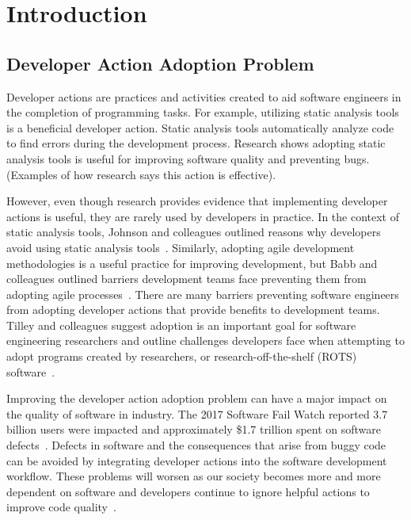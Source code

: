 \section{Introduction}

\subsection{Developer Action Adoption Problem}

Developer actions are practices and activities created to aid software engineers in the completion of programming tasks. For example, utilizing static analysis tools is a beneficial developer action. Static analysis tools automatically analyze code to find errors during the development process. Research shows adopting static analysis tools is useful for improving software quality and preventing bugs. (Examples of how research says this action is effective).

However, even though research provides evidence that implementing developer actions is useful, they are rarely used by developers in practice. In the context of static analysis tools, Johnson and colleagues outlined reasons why developers avoid using static analysis tools~\cite{Johnson2013Why}. Similarly, adopting agile development methodologies is a useful practice for improving development, but Babb and colleagues outlined barriers development teams face preventing them from adopting agile processes~\cite{BabbAgileBarriers}. There are many barriers preventing software engineers from adopting developer actions that provide benefits to development teams. Tilley and colleagues suggest adoption is an important goal for software engineering researchers and outline challenges developers face when attempting to adopt programs created by researchers, or research-off-the-shelf (ROTS) software~\cite{Tilley2003ROTS}. 

Improving the developer action adoption problem can have a major impact on the quality of software in industry. The 2017 Software Fail Watch reported 3.7 billion users were impacted and approximately \$1.7 trillion spent on software defects~\cite{SoftwareFailWatch}. Defects in software and the consequences that arise from buggy code can be avoided by integrating developer actions into the software development workflow. These problems will worsen as our society becomes more and more dependent on software and developers continue to ignore helpful actions to improve code quality~\cite{SoftwareEatWorld}.

